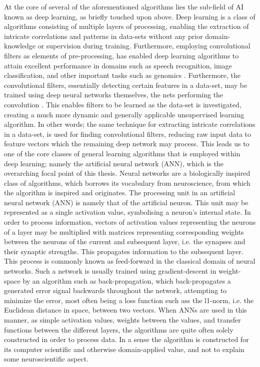 At the core of several of the aforementioned algorithms lies the sub-field of AI known as deep learning, as briefly touched upon above. Deep learning is a class of algorithms consisting of multiple layers of processing, enabling the extraction of intricate correlations and patterns in data-sets without any prior domain-knowledge or supervision during training. Furthermore, employing convolutional filters as elements of pre-processing, has enabled deep learning algorithms to attain excellent performance in domains such as speech recognition, image classification, and other important tasks such as genomics \citep{LeCun2015}. Furthermore, the convolutional filters, essentially detecting certain features in a data-set, may be trained using deep neural networks themselves, the nets performing the convolution \citep{LeCun2015}. This enables filters to be learned as the data-set is investigated, creating a much more dynamic and generally applicable unsupervised learning algorithm. In other words; the same technique for extracting intricate correlations in a data-set, is used for finding convolutional filters, reducing raw input data to feature vectors which the remaining deep network may process. This leads us to one of the core classes of general learning algorithms that is employed within deep learning; namely the artificial neural network (ANN), which is the overarching focal point of this thesis.
Neural networks are a biologically inspired class of algorithms, which borrows its vocabulary from neuroscience, from which the algorithm is inspired and originates. The processing unit in an artificial neural network (ANN) is namely that of the artificial neuron. This unit may be represented as a single activation value, symbolising a neuron's internal state. In order to process information, vectors of activation values representing the neurons of a layer may be multiplied with matrices representing corresponding weights between the neurons of the current and subsequent layer, i.e. the synapses and their synaptic strengths. This propagates information to the subsequent layer. This process is commonly known as feed-forward in the classical domain of neural networks. Such a network is usually trained using gradient-descent in weight-space by an algorithm such as back-propagation, which back-propagates a generated error signal backwards throughout the network, attempting to minimize the error, most often being a loss function such ass the l1-norm, i.e. the Euclidean distance in space, between two vectors. 
When ANNs are used in this manner, as simple activation values, weights between the values, and transfer functions between the different layers, the algorithms are quite often solely constructed in order to process data. In a sense the algorithm is constructed for its computer scientific and otherwise domain-applied value, and not to explain some neuroscientific aspect. 
\\

